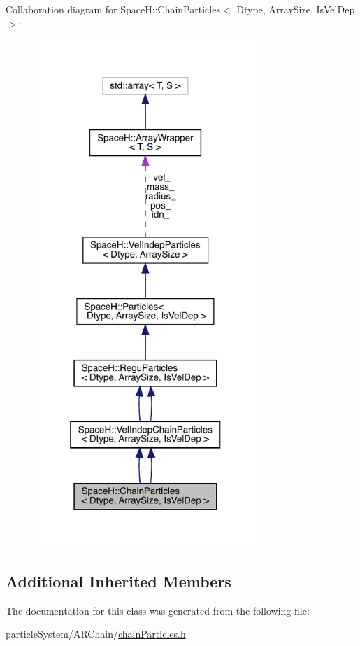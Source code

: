 Collaboration diagram for SpaceH\+:\+:Chain\+Particles$<$ Dtype, Array\+Size, Is\+Vel\+Dep $>$\+:
\nopagebreak
\begin{figure}[H]
\begin{center}
\leavevmode
\includegraphics[width=241pt]{class_space_h_1_1_chain_particles__coll__graph}
\end{center}
\end{figure}
\subsection*{Additional Inherited Members}


The documentation for this class was generated from the following file\+:\begin{DoxyCompactItemize}
\item 
particle\+System/\+A\+R\+Chain/\mbox{\hyperlink{chain_particles_8h}{chain\+Particles.\+h}}\end{DoxyCompactItemize}
